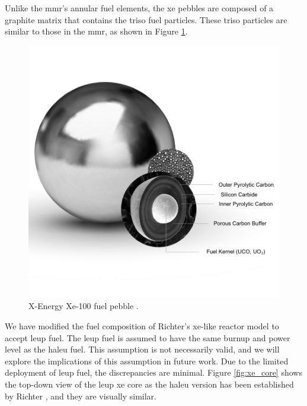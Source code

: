 Unlike the \gls{mmr}'s annular fuel elements, the \gls{xe} pebbles are composed of a graphite matrix that contains the \gls{triso} fuel particles. These \gls{triso} particles are similar to those in the \gls{mmr}, as shown in Figure \ref{fig:xe_fuel}.

\begin{figure}[H]
    \centering
    \includegraphics[scale=0.28]{images/reactor_design/graphic-triso-x-pebble.jpg}
    \caption{X-Energy Xe-100 fuel pebble \cite{xe_fuel}.}
    \label{fig:xe_fuel}
\end{figure}


We have modified the fuel composition of Richter's \gls{xe}-like reactor model to accept \gls{leup} fuel. The \gls{leup} fuel is assumed to have the same burnup and power level as the \gls{haleu} fuel. This assumption is not necessarily valid, and we will explore the implications of this assumption in future work. Due to the limited deployment of \gls{leup} fuel, the discrepancies are minimal. Figure \ref{fig:xe_core} shows the top-down view of the \gls{leup} \gls{xe} core as the \gls{haleu} version has been established by Richter \cite{richter_thesis_2022}, and they are visually similar.

